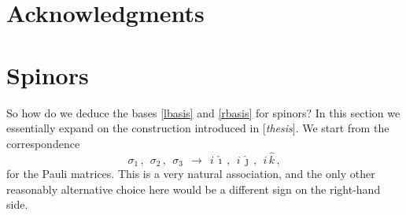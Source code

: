 \documentclass[epsfig,12pt]{article}
\newcommand{\ii}{\hat\imath}
\newcommand{\jj}{\hat\jmath}
\newcommand{\kk}{\hat k}
\begin{document}
\section*{Acknowledgments}




\pagebreak
\appendix
\setcounter{equation}{0}


\section{Spinors}
\label{section-spinors}

	So how do we deduce the bases \eqref{lbasis} and \eqref{rbasis} for spinors?
	In this section we essentially expand on the construction introduced in [\emph{thesis}].
	We start from the correspondence
\begin{equation}
	\sigma_1\,,~~ \sigma_2\,,~~ \sigma_3	~~\to~~		i\,\ii\,,~~ i\,\jj\,,~~ i\,\kk\,,
\end{equation}
	for the Pauli matrices.
	This is a very natural association, and the only other reasonably alternative choice here
	would be a different sign on the right-hand side.
\end{document}
